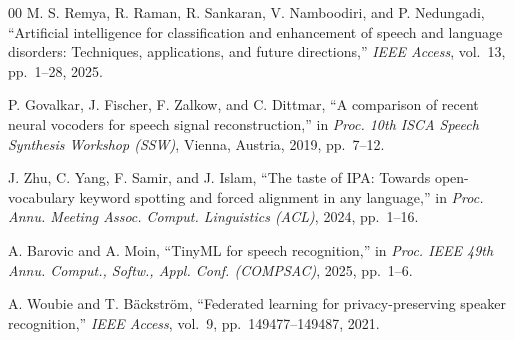 \documentclass[conference]{IEEEtran}
\begin{document}
\begin{thebibliography}{00}
 M. S. Remya, R. Raman, R. Sankaran, V. Namboodiri, and P. Nedungadi, ``Artificial intelligence for classification and enhancement of speech and language disorders: Techniques, applications, and future directions,'' \textit{IEEE Access}, vol.~13, pp.~1--28, 2025.

 P. Govalkar, J. Fischer, F. Zalkow, and C. Dittmar, ``A comparison of recent neural vocoders for speech signal reconstruction,'' in \textit{Proc. 10th ISCA Speech Synthesis Workshop (SSW)}, Vienna, Austria, 2019, pp.~7--12.

 J. Zhu, C. Yang, F. Samir, and J. Islam, ``The taste of IPA: Towards open-vocabulary keyword spotting and forced alignment in any language,'' in \textit{Proc. Annu. Meeting Assoc. Comput. Linguistics (ACL)}, 2024, pp.~1--16.

 A. Barovic and A. Moin, ``TinyML for speech recognition,'' in \textit{Proc. IEEE 49th Annu. Comput., Softw., Appl. Conf. (COMPSAC)}, 2025, pp.~1--6.

 A. Woubie and T. B\"ackstr\"om, ``Federated learning for privacy-preserving speaker recognition,'' \textit{IEEE Access}, vol.~9, pp.~149477--149487, 2021.

\end{thebibliography}

\end{document}
